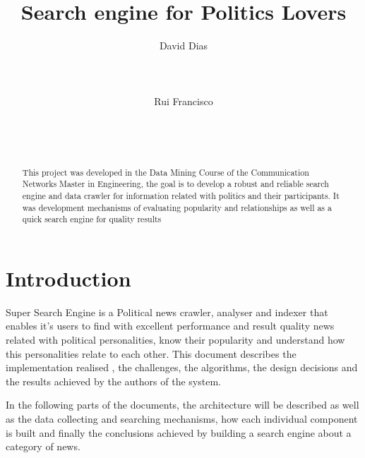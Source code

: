 \documentclass{acm_proc_article-sp}
\begin{document}
\title{Search engine for {\ttlit Politics} Lovers}

\author{
\alignauthor
David Dias\\
       \\
       \\
       \\
\alignauthor
Rui Francisco\\
       \\
       \\
       \\
}
\maketitle
\begin{abstract}
This project was developed in the Data Mining Course of the Communication Networks Master in Engineering, the goal is to develop a robust and reliable search engine and data crawler for information related with politics and their participants. It was development mechanisms of evaluating popularity and relationships as well as a quick search engine for quality results
\end{abstract}



\section{Introduction}
Super Search Engine is a Political news crawler, analyser and indexer that enables it's users to find with excellent performance and result quality news related with political personalities, know their popularity and understand how this personalities relate to each other. This document describes the implementation realised , the challenges, the algorithms, the design decisions and the results achieved by the authors of the system.

In the following parts of the documents, the architecture will be described as well as the data collecting and searching mechanisms, how each individual component is built and finally the conclusions achieved by building a search engine about a category of news.
\end{document}

